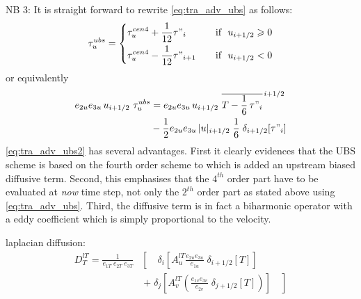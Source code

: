 \documentclass[../main/NEMO_manual]{subfiles}
\begin{document}
NB 3: It is straight forward to rewrite \autoref{eq:tra_adv_ubs} as follows:
\begin{equation}
  \label{eq:tra_adv_ubs2}
  \tau_u^{ubs} = \left\{
	 \begin{aligned}
      & \tau_u^{cen4} + \frac{1}{12} \tau"_i		& \quad \text{if }\ u_{i+1/2} \geqslant 0 \\
      & \tau_u^{cen4} - \frac{1}{12} \tau"_{i+1}	& \quad \text{if }\ u_{i+1/2}       <       0
    \end{aligned}
  \right.
\end{equation}
or equivalently 
\begin{equation}
  \label{eq:tra_adv_ubs2}
  \begin{split}
    e_{2u} e_{3u}\,u_{i+1/2} \ \tau_u^{ubs}
    &= e_{2u} e_{3u}\,u_{i+1/2} \ \overline{ T - \frac{1}{6}\,\tau"_i }^{\,i+1/2} \\
    & - \frac{1}{2} e_{2u} e_{3u}\,|u|_{i+1/2} \;\frac{1}{6} \;\delta_{i+1/2}[\tau"_i]
  \end{split}
\end{equation}
\autoref{eq:tra_adv_ubs2} has several advantages.
First it clearly evidences that the UBS scheme is based on the fourth order scheme to which
is added an upstream biased diffusive term.
Second, this emphasises that the $4^{th}$ order part have to be evaluated at \emph{now} time step,
not only the $2^{th}$ order part as stated above using \autoref{eq:tra_adv_ubs}.
Third, the diffusive term is in fact a biharmonic operator with a eddy coefficient which
is simply proportional to the velocity.

laplacian diffusion:
\begin{equation}
  \label{eq:tra_ldf_lap}
  \begin{split}
    D_T^{lT} =\frac{1}{e_{1T} \; e_{2T}\;  e_{3T} } &\left[ {\quad \delta_i
        \left[ {A_u^{lT} \frac{e_{2u} e_{3u} }{e_{1u} }\;\delta_{i+1/2}
            \left[ T \right]} \right]} \right. \\
    &\ \left. {+\; \delta_j \left[
          {A_v^{lT} \left( {\frac{e_{1v} e_{3v} }{e_{2v} }\;\delta_{j+1/2} \left[ T
                \right]} \right)} \right]\quad } \right]
  \end{split}
\end{equation}
\end{document}
